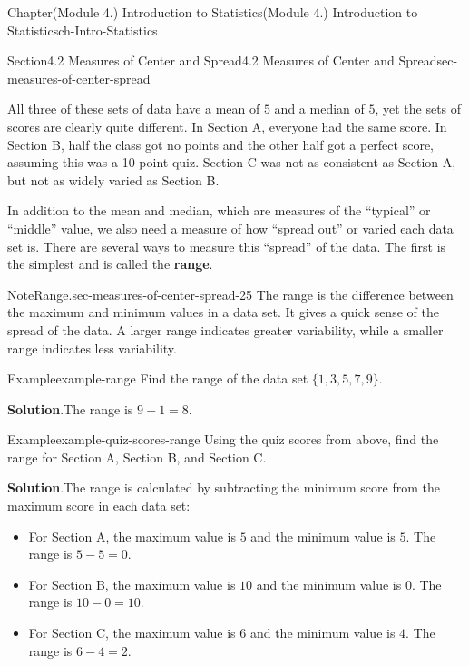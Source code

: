 \documentclass[oneside,10pt,]{book}
\newcommand{\blocktitlefont}{\relax}
\newcommand{\ptxlistdisc}{\raisebox{0.3ex}{\textbullet}}
\newcommand{\terminology}[1]{\textbf{#1}}
\begin{document}
\begin{chapterptx}{Chapter}{(Module 4.) Introduction to Statistics}{}{(Module 4.) Introduction to Statistics}{}{}{ch-Intro-Statistics}
\begin{sectionptx}{Section}{4.2 Measures of Center and Spread}{}{4.2 Measures of Center and Spread}{}{}{sec-measures-of-center-spread}
%
\par
All three of these sets of data have a mean of \(5\) and a median of \(5\), yet the sets of scores are clearly quite different. In Section A, everyone had the same score. In Section B, half the class got no points and the other half got a perfect score, assuming this was a 10-point quiz. Section C was not as consistent as Section A, but not as widely varied as Section B.%
\par
In addition to the mean and median, which are measures of the \textquotedblleft{}typical\textquotedblright{} or \textquotedblleft{}middle\textquotedblright{} value, we also need a measure of how \textquotedblleft{}spread out\textquotedblright{} or varied each data set is. There are several ways to measure this \textquotedblleft{}spread\textquotedblright{} of the data. The first is the simplest and is called the \terminology{range}.%
\begin{note}{Note}{Range.}{sec-measures-of-center-spread-25}%
The range is the difference between the maximum and minimum values in a data set. It gives a quick sense of the spread of the data. A larger range indicates greater variability, while a smaller range indicates less variability.%
\end{note}
\begin{example}{Example}{}{example-range}%
Find the range of the data set \(\{1, 3, 5, 7, 9\}\).%
\par\smallskip%
\noindent\textbf{\blocktitlefont Solution}.\hypertarget{example-range-2}{}\quad{}The range is \(9 - 1 = 8\).%
\end{example}
\begin{example}{Example}{}{example-quiz-scores-range}%
Using the quiz scores from above, find the range for Section A, Section B, and Section C.%
\par\smallskip%
\noindent\textbf{\blocktitlefont Solution}.\hypertarget{example-quiz-scores-range-2}{}\quad{}The range is calculated by subtracting the minimum score from the maximum score in each data set:%
\par
%
\begin{itemize}[label=\ptxlistdisc]
\item{}For Section A, the maximum value is \(5\) and the minimum value is \(5\). The range is \(5 - 5 = 0\).%
\item{}For Section B, the maximum value is \(10\) and the minimum value is \(0\). The range is \(10 - 0 = 10\).%
\item{}For Section C, the maximum value is \(6\) and the minimum value is \(4\). The range is \(6 - 4 = 2\).%

\end{itemize}
\end{example}
\end{sectionptx}
\end{chapterptx}
\end{document}
